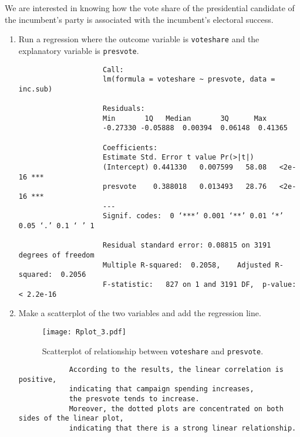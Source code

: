 \documentclass[12pt,letterpaper]{article}
\begin{document}
\noindent We are interested in knowing how the vote share of the presidential candidate of the incumbent's party is associated with the incumbent's electoral success.
	\vspace{.25cm}
	\begin{enumerate}
		\item Run a regression where the outcome variable is \texttt{voteshare} and the explanatory variable is \texttt{presvote}.
			
			\vspace{.15cm}
			
			\begin{footnotesize}
				\begin{verbatim}
					Call:
					lm(formula = voteshare ~ presvote, data = inc.sub)
					
					Residuals:
					Min       1Q   Median       3Q      Max 
					-0.27330 -0.05888  0.00394  0.06148  0.41365 
					
					Coefficients:
					Estimate Std. Error t value Pr(>|t|)    
					(Intercept) 0.441330   0.007599   58.08   <2e-16 ***
					presvote    0.388018   0.013493   28.76   <2e-16 ***
					---
					Signif. codes:  0 ‘***’ 0.001 ‘**’ 0.01 ‘*’ 0.05 ‘.’ 0.1 ‘ ’ 1
					
					Residual standard error: 0.08815 on 3191 degrees of freedom
					Multiple R-squared:  0.2058,	Adjusted R-squared:  0.2056 
					F-statistic:   827 on 1 and 3191 DF,  p-value: < 2.2e-16
			\end{verbatim}
		\end{footnotesize}
		
		\item Make a scatterplot of the two variables and add the regression line. 
		
		\vspace{.15cm}
		
		\vspace{.15cm}
		\begin{figure}[h!]\centering
			
			\caption{\footnotesize Scatterplot of relationship between \texttt{voteshare} and \texttt{presvote}.}
			\label{fig:Rplot_3}
			\texttt{[image: Rplot\_3.pdf]}
		\end{figure}
		\begin{footnotesize}
			\begin{verbatim}
			According to the results, the linear correlation is positive, 
			indicating that campaign spending increases, 
			the presvote tends to increase.
			Moreover, the dotted plots are concentrated on both sides of the linear plot, 
			indicating that there is a strong linear relationship.	
				

\end{verbatim}
\end{footnotesize}
\end{enumerate}
\end{document}
